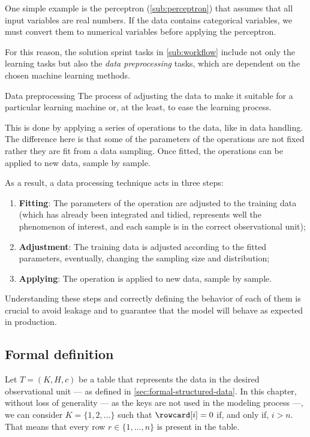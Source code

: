 One simple example is the perceptron (\cref{sub:perceptron}) that assumes that all
input variables are real numbers.  If the data contains categorical variables, we must
convert them to numerical variables before applying the perceptron.

For this reason, the solution sprint tasks in \cref{sub:workflow} include not only the
learning tasks but also the \emph{data preprocessing} tasks, which are dependent on the
chosen machine learning methods.

\begin{definition}{Data preprocessing}\label{def:preprocessing}
  The process of adjusting the data to make it suitable for a particular learning machine
  or, at the least, to ease the learning process.
\end{definition}

This is done by applying a series of operations to the data, like in data handling.  The
difference here is that some of the parameters of the operations are not fixed rather they
are fit from a data sampling.  Once fitted, the operations can be applied to
new data, sample by sample.

As a result, a data processing technique acts in three steps:
\begin{enumerate}
  \itemsep0em
  \item \textbf{Fitting}: The parameters of the operation are adjusted to the training
    data (which has already been integrated and tidied, represents well the phenomenon of
    interest, and each sample is in the correct observational unit);
  \item \textbf{Adjustment}: The training data is adjusted according to the fitted
    parameters, eventually, changing the sampling size and distribution;
  \item \textbf{Applying}: The operation is applied to new data, sample by sample.
\end{enumerate}

Understanding these steps and correctly defining the behavior of each of them is crucial
to avoid \gls{leakage} and to guarantee that the model will behave as expected in
production.

\subsection{Formal definition}
\label{sub:formal-preprocessing}

Let $T = (K, H, c)$ be a table that represents the data in the desired observational unit
--- as defined in \cref{sec:formal-structured-data}.  In this chapter, without loss of
generality --- as the keys are not used in the modeling process ---, we can consider $K =
\{1, 2, \dots\}$ such that $\rowcard[i] = 0$ if, and only if, $i > n$.  That means that
every row $r \in \{1, \dots, n\}$ is present in the table.


